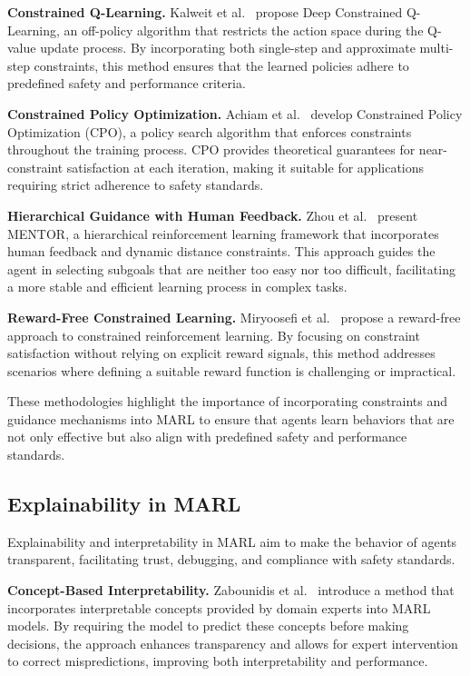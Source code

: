 \documentclass[pdflatex,sn-mathphys-num]{sn-jnl}%
\theoremstyle{thmstyleone}%
\theoremstyle{thmstyletwo}%
\theoremstyle{thmstylethree}%
\begin{document}
\textbf{Constrained Q-Learning.} Kalweit et al.~\cite{kalweit2020deep} propose Deep Constrained Q-Learning, an off-policy algorithm that restricts the action space during the Q-value update process. By incorporating both single-step and approximate multi-step constraints, this method ensures that the learned policies adhere to predefined safety and performance criteria.

\textbf{Constrained Policy Optimization.} Achiam et al.~\cite{achiam2017constrained} develop Constrained Policy Optimization (CPO), a policy search algorithm that enforces constraints throughout the training process. CPO provides theoretical guarantees for near-constraint satisfaction at each iteration, making it suitable for applications requiring strict adherence to safety standards.

\textbf{Hierarchical Guidance with Human Feedback.} Zhou et al.~\cite{zhou2024mentor} present MENTOR, a hierarchical reinforcement learning framework that incorporates human feedback and dynamic distance constraints. This approach guides the agent in selecting subgoals that are neither too easy nor too difficult, facilitating a more stable and efficient learning process in complex tasks.

\textbf{Reward-Free Constrained Learning.} Miryoosefi et al.~\cite{miryoosefi2022simple} propose a reward-free approach to constrained reinforcement learning. By focusing on constraint satisfaction without relying on explicit reward signals, this method addresses scenarios where defining a suitable reward function is challenging or impractical.

These methodologies highlight the importance of incorporating constraints and guidance mechanisms into MARL to ensure that agents learn behaviors that are not only effective but also align with predefined safety and performance standards.


\subsection{Explainability in MARL}\label{sub-sec:rel_evaluation}

Explainability and interpretability in MARL aim to make the behavior of agents transparent, facilitating trust, debugging, and compliance with safety standards.

\textbf{Concept-Based Interpretability.} Zabounidis et al.~\cite{zabounidis2023concept} introduce a method that incorporates interpretable concepts provided by domain experts into MARL models. By requiring the model to predict these concepts before making decisions, the approach enhances transparency and allows for expert intervention to correct mispredictions, improving both interpretability and performance.
\end{document}
